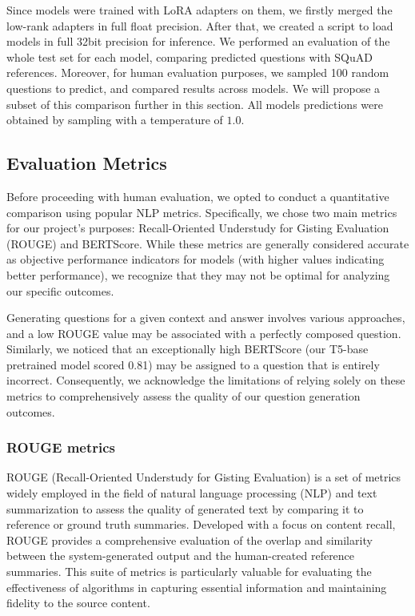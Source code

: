\documentclass{article}
\begin{document}
Since models were trained with LoRA adapters on them, we firstly merged the low-rank adapters in full float precision. After that, we created a script to load models in full 32bit precision for inference. We performed an evaluation of the whole test set for each model, comparing predicted questions with SQuAD references. Moreover, for human evaluation purposes, we sampled 100 random questions to predict, and compared results across models. We will propose a subset of this comparison further in this section. All models predictions were obtained by sampling with a temperature of $1.0$.

\subsection{Evaluation Metrics}
Before proceeding with human evaluation, we opted to conduct a quantitative comparison using popular NLP metrics. Specifically, we chose two main metrics for our project's purposes: Recall-Oriented Understudy for Gisting Evaluation (ROUGE) \cite{lin-2004-rouge} and BERTScore. While these metrics are generally considered accurate as objective performance indicators for models (with higher values indicating better performance), we recognize that they may not be optimal for analyzing our specific outcomes.

Generating questions for a given context and answer involves various approaches, and a low ROUGE value may be associated with a perfectly composed question. Similarly, we noticed that an exceptionally high BERTScore  (our T5-base pretrained model scored 0.81) may be assigned to a question that is entirely incorrect. Consequently, we acknowledge the limitations of relying solely on these metrics to comprehensively assess the quality of our question generation outcomes.

\subsubsection{ROUGE metrics}
ROUGE (Recall-Oriented Understudy for Gisting Evaluation) is a set of metrics widely employed in the field of natural language processing (NLP) and text summarization to assess the quality of generated text by comparing it to reference or ground truth summaries. Developed with a focus on content recall, ROUGE provides a comprehensive evaluation of the overlap and similarity between the system-generated output and the human-created reference summaries. This suite of metrics is particularly valuable for evaluating the effectiveness of algorithms in capturing essential information and maintaining fidelity to the source content.
\end{document}
